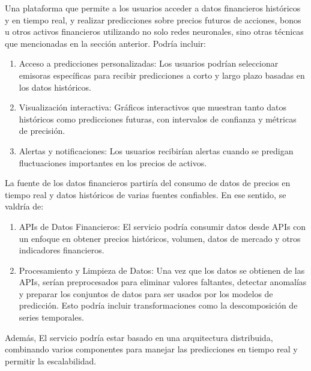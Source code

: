 Una plataforma que permite a los usuarios acceder a datos financieros históricos y en tiempo real, y realizar predicciones sobre precios futuros de acciones, bonos u otros activos financieros utilizando no solo redes neuronales, sino otras técnicas que mencionadas en la sección anterior. Podría incluir:

\begin{enumerate}
    \item Acceso a predicciones personalizadas: Los usuarios podrían seleccionar emisoras específicas para recibir predicciones a corto y largo plazo basadas en los datos históricos.
    \item Visualización interactiva: Gráficos interactivos que muestran tanto datos históricos como predicciones futuras, con intervalos de confianza y métricas de precisión.
    \item Alertas y notificaciones: Los usuarios recibirían alertas cuando se predigan fluctuaciones importantes en los precios de activos.
\end{enumerate}

La fuente de los datos financieros partiría del consumo de datos de precios en tiempo real y datos históricos de varias fuentes confiables. En ese sentido, se valdría de:

\begin{enumerate}
    \item APIs de Datos Financieros: El servicio podría consumir datos desde APIs con un enfoque en obtener precios históricos, volumen, datos de mercado y otros indicadores financieros.
    \item Procesamiento y Limpieza de Datos: Una vez que los datos se obtienen de las APIs, serían preprocesados para eliminar valores faltantes, detectar anomalías y preparar los conjuntos de datos para ser usados por los modelos de predicción. Esto podría incluir transformaciones como la descomposición de series temporales.
\end{enumerate}

Además, El servicio podría estar basado en una arquitectura distribuida, combinando varios componentes para manejar las predicciones en tiempo real y permitir la escalabilidad.



